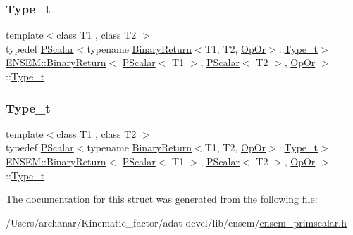 \subsubsection{\texorpdfstring{Type\_t}{Type\_t}\hspace{0.1cm}{\footnotesize\ttfamily [2/3]}}
{\footnotesize\ttfamily template$<$class T1 , class T2 $>$ \\
typedef \mbox{\hyperlink{classENSEM_1_1PScalar}{P\+Scalar}}$<$typename \mbox{\hyperlink{structENSEM_1_1BinaryReturn}{Binary\+Return}}$<$T1, T2, \mbox{\hyperlink{structENSEM_1_1OpOr}{Op\+Or}}$>$\+::\mbox{\hyperlink{structENSEM_1_1BinaryReturn_3_01PScalar_3_01T1_01_4_00_01PScalar_3_01T2_01_4_00_01OpOr_01_4_a20c035d4e3497954d3af72c7e41d7201}{Type\+\_\+t}}$>$ \mbox{\hyperlink{structENSEM_1_1BinaryReturn}{E\+N\+S\+E\+M\+::\+Binary\+Return}}$<$ \mbox{\hyperlink{classENSEM_1_1PScalar}{P\+Scalar}}$<$ T1 $>$, \mbox{\hyperlink{classENSEM_1_1PScalar}{P\+Scalar}}$<$ T2 $>$, \mbox{\hyperlink{structENSEM_1_1OpOr}{Op\+Or}} $>$\+::\mbox{\hyperlink{structENSEM_1_1BinaryReturn_3_01PScalar_3_01T1_01_4_00_01PScalar_3_01T2_01_4_00_01OpOr_01_4_a20c035d4e3497954d3af72c7e41d7201}{Type\+\_\+t}}}

\mbox{\label{structENSEM_1_1BinaryReturn_3_01PScalar_3_01T1_01_4_00_01PScalar_3_01T2_01_4_00_01OpOr_01_4_a20c035d4e3497954d3af72c7e41d7201}} 
\subsubsection{\texorpdfstring{Type\_t}{Type\_t}\hspace{0.1cm}{\footnotesize\ttfamily [3/3]}}
{\footnotesize\ttfamily template$<$class T1 , class T2 $>$ \\
typedef \mbox{\hyperlink{classENSEM_1_1PScalar}{P\+Scalar}}$<$typename \mbox{\hyperlink{structENSEM_1_1BinaryReturn}{Binary\+Return}}$<$T1, T2, \mbox{\hyperlink{structENSEM_1_1OpOr}{Op\+Or}}$>$\+::\mbox{\hyperlink{structENSEM_1_1BinaryReturn_3_01PScalar_3_01T1_01_4_00_01PScalar_3_01T2_01_4_00_01OpOr_01_4_a20c035d4e3497954d3af72c7e41d7201}{Type\+\_\+t}}$>$ \mbox{\hyperlink{structENSEM_1_1BinaryReturn}{E\+N\+S\+E\+M\+::\+Binary\+Return}}$<$ \mbox{\hyperlink{classENSEM_1_1PScalar}{P\+Scalar}}$<$ T1 $>$, \mbox{\hyperlink{classENSEM_1_1PScalar}{P\+Scalar}}$<$ T2 $>$, \mbox{\hyperlink{structENSEM_1_1OpOr}{Op\+Or}} $>$\+::\mbox{\hyperlink{structENSEM_1_1BinaryReturn_3_01PScalar_3_01T1_01_4_00_01PScalar_3_01T2_01_4_00_01OpOr_01_4_a20c035d4e3497954d3af72c7e41d7201}{Type\+\_\+t}}}



The documentation for this struct was generated from the following file\+:\begin{DoxyCompactItemize}
\item 
/\+Users/archanar/\+Kinematic\+\_\+factor/adat-\/devel/lib/ensem/\mbox{\hyperlink{adat-devel_2lib_2ensem_2ensem__primscalar_8h}{ensem\+\_\+primscalar.\+h}}\end{DoxyCompactItemize}
